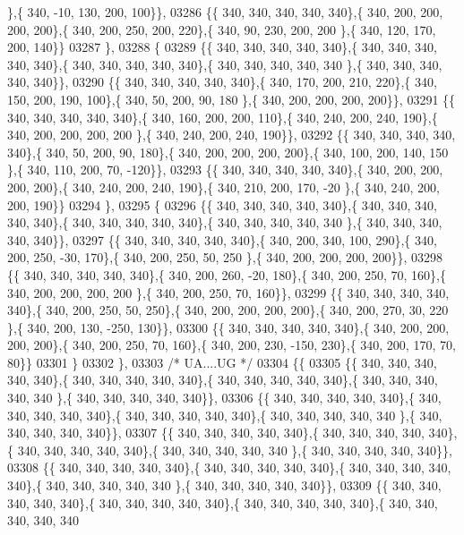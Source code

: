 \begin{DoxyCode}
      \},\{ 340, -10, 130, 200, 100\}\},
03286 \{\{ 340, 340, 340, 340, 340\},\{ 340, 200, 200, 200, 200\},\{ 340, 200, 250, 200, 220\},\{ 340,  90, 230, 200, 200
      \},\{ 340, 120, 170, 200, 140\}\}
03287 \},
03288 \{
03289 \{\{ 340, 340, 340, 340, 340\},\{ 340, 340, 340, 340, 340\},\{ 340, 340, 340, 340, 340\},\{ 340, 340, 340, 340, 340
      \},\{ 340, 340, 340, 340, 340\}\},
03290 \{\{ 340, 340, 340, 340, 340\},\{ 340, 170, 200, 210, 220\},\{ 340, 150, 200, 190, 100\},\{ 340,  50, 200,  90, 180
      \},\{ 340, 200, 200, 200, 200\}\},
03291 \{\{ 340, 340, 340, 340, 340\},\{ 340, 160, 200, 200, 110\},\{ 340, 240, 200, 240, 190\},\{ 340, 200, 200, 200, 200
      \},\{ 340, 240, 200, 240, 190\}\},
03292 \{\{ 340, 340, 340, 340, 340\},\{ 340,  50, 200,  90, 180\},\{ 340, 200, 200, 200, 200\},\{ 340, 100, 200, 140, 150
      \},\{ 340, 110, 200,  70, -120\}\},
03293 \{\{ 340, 340, 340, 340, 340\},\{ 340, 200, 200, 200, 200\},\{ 340, 240, 200, 240, 190\},\{ 340, 210, 200, 170, -20
      \},\{ 340, 240, 200, 200, 190\}\}
03294 \},
03295 \{
03296 \{\{ 340, 340, 340, 340, 340\},\{ 340, 340, 340, 340, 340\},\{ 340, 340, 340, 340, 340\},\{ 340, 340, 340, 340, 340
      \},\{ 340, 340, 340, 340, 340\}\},
03297 \{\{ 340, 340, 340, 340, 340\},\{ 340, 200, 340, 100, 290\},\{ 340, 200, 250, -30, 170\},\{ 340, 200, 250,  50, 250
      \},\{ 340, 200, 200, 200, 200\}\},
03298 \{\{ 340, 340, 340, 340, 340\},\{ 340, 200, 260, -20, 180\},\{ 340, 200, 250,  70, 160\},\{ 340, 200, 200, 200, 200
      \},\{ 340, 200, 250,  70, 160\}\},
03299 \{\{ 340, 340, 340, 340, 340\},\{ 340, 200, 250,  50, 250\},\{ 340, 200, 200, 200, 200\},\{ 340, 200, 270,  30, 220
      \},\{ 340, 200, 130, -250, 130\}\},
03300 \{\{ 340, 340, 340, 340, 340\},\{ 340, 200, 200, 200, 200\},\{ 340, 200, 250,  70, 160\},\{ 340, 200, 230, -150, 
      230\},\{ 340, 200, 170,  70,  80\}\}
03301 \}
03302 \},
03303 \textcolor{comment}{/* UA....UG */}
03304 \{\{
03305 \{\{ 340, 340, 340, 340, 340\},\{ 340, 340, 340, 340, 340\},\{ 340, 340, 340, 340, 340\},\{ 340, 340, 340, 340, 340
      \},\{ 340, 340, 340, 340, 340\}\},
03306 \{\{ 340, 340, 340, 340, 340\},\{ 340, 340, 340, 340, 340\},\{ 340, 340, 340, 340, 340\},\{ 340, 340, 340, 340, 340
      \},\{ 340, 340, 340, 340, 340\}\},
03307 \{\{ 340, 340, 340, 340, 340\},\{ 340, 340, 340, 340, 340\},\{ 340, 340, 340, 340, 340\},\{ 340, 340, 340, 340, 340
      \},\{ 340, 340, 340, 340, 340\}\},
03308 \{\{ 340, 340, 340, 340, 340\},\{ 340, 340, 340, 340, 340\},\{ 340, 340, 340, 340, 340\},\{ 340, 340, 340, 340, 340
      \},\{ 340, 340, 340, 340, 340\}\},
03309 \{\{ 340, 340, 340, 340, 340\},\{ 340, 340, 340, 340, 340\},\{ 340, 340, 340, 340, 340\},\{ 340, 340, 340, 340, 340

\end{DoxyCode}
